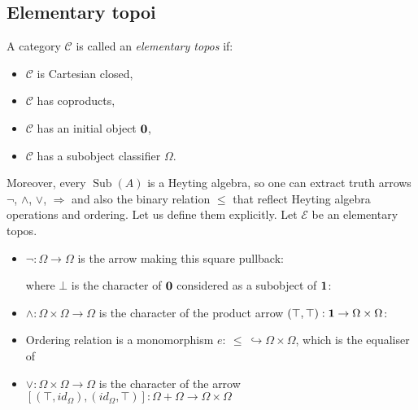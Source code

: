 \documentclass[a4paper]{article}
\theoremstyle{defin}
\theoremstyle{theorem}
\theoremstyle{claim}
\theoremstyle{prop}
\theoremstyle{lemma}
\theoremstyle{fact}
\theoremstyle{ex}
\theoremstyle{col}
\begin{document}
\subsection{Elementary topoi}

A category $\mathcal{C}$ is called an \emph{elementary topos} if:
\begin{itemize}
\item $\mathcal{C}$ is Cartesian closed,
\item $\mathcal{C}$ has coproducts,
\item $\mathcal{C}$ has an initial object ${\bf 0}$,
\item $\mathcal{C}$ has a subobject classifier $\Omega$.
\end{itemize}

Moreover, every $\operatorname{Sub}(A)$ is a Heyting algebra, so one can extract truth arrows $\neg$, $\land$, $\vee$, $\Rightarrow$ and also the binary relation $\leq$ that reflect Heyting algebra operations and ordering. Let us define them explicitly. Let $\mathcal{E}$ be an elementary topos.
\begin{itemize}
\item $\neg : \Omega \to \Omega$ is the arrow making this square pullback:

\centerline{
}

where $\bot$ is the character of ${\bf 0}$ considered as a subobject of ${\bf 1}$:

\centerline{
}
\item $\wedge : \Omega \times \Omega \to \Omega$ is the character of the product arrow $(\top, \top) : {\bf 1} \to \Omega \times \Omega$:

\centerline{
}
\item Ordering relation is a monomorphism $e : \: \leq \: \hookrightarrow \Omega \times \Omega$, which is the equaliser of

\centerline{
}

\item $\vee : \Omega \times \Omega \to \Omega$ is the character of the arrow $[(\top, id_{\Omega}),(id_{\Omega}, \top)] : \Omega + \Omega \to \Omega \times \Omega$
\end{itemize}
\end{document}
